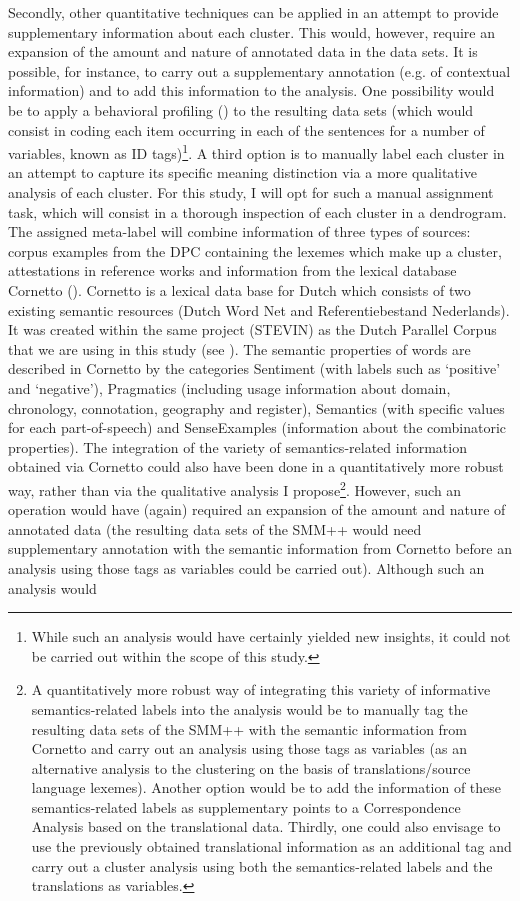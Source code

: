 Secondly, other quantitative techniques can be applied in an attempt to provide supplementary information about each cluster. This would, however, require an expansion of the amount and nature of annotated data in the data sets. It is possible, for instance, to carry out a supplementary annotation (e.g. of contextual information) and to add this information to the analysis. One possibility would be to apply a behavioral profiling (\citealt{divjak_ways_2006, divjak_clusters_2008, evans_behavioral_2009}) to the resulting data sets (which would consist in coding each item occurring in each of the sentences for a number of variables, known as ID tags)\footnote{While such an analysis would have certainly yielded new insights, it could not be carried out within the scope of this study.}. A third option is to manually label each cluster in an attempt to capture its specific meaning distinction via a more qualitative analysis of each cluster. For this study, I will opt for such a manual assignment task, which will consist in a thorough inspection of each cluster in a dendrogram. The assigned meta-label will combine information of three types of sources: corpus examples from the DPC containing the lexemes which make up a cluster, attestations in reference works and information from the lexical database Cornetto (\citealt{vossen_cornetto_2008, spyns_cornetto:_2013}). Cornetto is a lexical data base for Dutch which consists of two existing semantic resources (Dutch Word Net and Referentiebestand Nederlands). It was created within the same project (STEVIN) as the Dutch Parallel Corpus that we are using in this study (see ). The semantic properties of words are described in Cornetto by the categories Sentiment (with labels such as ‘positive’ and ‘negative’), Pragmatics (including usage information about domain, chronology, connotation, geography and register), Semantics (with specific values for each part-of-speech) and SenseExamples (information about the combinatoric properties). The integration of the variety of semantics-related information obtained via Cornetto could also have been done in a quantitatively more robust way, rather than via the qualitative analysis I propose\footnote{A quantitatively more robust way of integrating this variety of informative semantics-related labels into the analysis would be to manually tag the resulting data sets of the SMM++ with the semantic information from Cornetto and carry out an analysis using those tags as variables (as an alternative analysis to the clustering on the basis of translations/source language lexemes). Another option would be to add the information of these semantics-related labels as supplementary points to a Correspondence Analysis based on the translational data. Thirdly, one could also envisage to use the previously obtained translational information as an additional tag and carry out a cluster analysis using both the semantics-related labels and the translations as variables.}. However, such an operation would have (again) required an expansion of the amount and nature of annotated data (the resulting data sets of the SMM++ would need supplementary annotation with the semantic information from Cornetto before an analysis using those tags as variables could be carried out). Although such an analysis would 